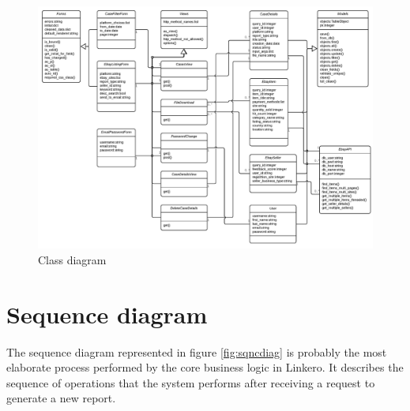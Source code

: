 \begin{figure}[H]
\centering
\includegraphics[angle=90, scale=0.9]{imgs/ClassDiag.pdf}
\caption{Class diagram}
\label{fig:clssdiag}
\end{figure}

\section{Sequence diagram}
The sequence diagram represented in figure \ref{fig:sqncdiag} is probably the
most elaborate process performed by the core business logic in Linkero. It
describes the sequence of operations that the system performs after receiving a
request to generate a new report.

